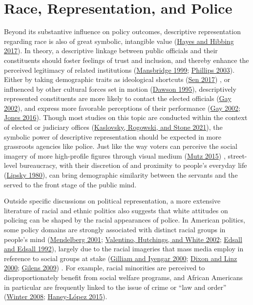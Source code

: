 \documentclass[
  12pt,
]{article}
\begin{document}
\hypertarget{race-representation-and-police}{%
\section{Race, Representation, and
Police}\label{race-representation-and-police}}

Beyond its substantive influence on policy outcomes, descriptive
representation regarding race is also of great symbolic, intangible
value (\protect\hyperlink{ref-hayes2017}{Hayes and Hibbing 2017}). In
theory, a descriptive linkage between public officials and their
constituents should foster feelings of trust and inclusion, and thereby
enhance the perceived legitimacy of related institutions
(\protect\hyperlink{ref-mansbridge1999}{Mansbridge 1999};
\protect\hyperlink{ref-phillips2003}{Phillips 2003}). Either by taking
demographic traits as ideological shortcuts
(\protect\hyperlink{ref-sen2017}{Sen 2017}) , or influenced by other
cultural forces set in motion (\protect\hyperlink{ref-dawson1995}{Dawson
1995}), descriptively represented constituents are more likely to
contact the elected officials (\protect\hyperlink{ref-gay2002}{Gay
2002}), and express more favorable perceptions of their performance
(\protect\hyperlink{ref-gay2002}{Gay 2002};
\protect\hyperlink{ref-jones2016}{Jones 2016}). Though most studies on
this topic are conducted within the context of elected or judiciary
offices (\protect\hyperlink{ref-kaslovsky2021}{Kaslovsky, Rogowski, and
Stone 2021}), the symbolic power of descriptive representation should be
expected in more grassroots agencies like police. Just like the way
voters can perceive the social imagery of more high-profile figures
through visual medium (\protect\hyperlink{ref-mutz2015}{Mutz 2015}) ,
street-level bureaucracy, with their discretion of and proximity to
people's everyday life (\protect\hyperlink{ref-lipsky1980}{Lipsky
1980}), can bring demographic similarity between the servants and the
served to the front stage of the public mind.

Outside specific discussions on political representation, a more
extensive literature of racial and ethnic politics also suggests that
white attitudes on policing can be shaped by the racial appearances of
police. In American politics, some policy domains are strongly
associated with distinct racial groups in people's mind
(\protect\hyperlink{ref-mendelberg2001}{Mendelberg 2001};
\protect\hyperlink{ref-valentino2002}{Valentino, Hutchings, and White
2002}; \protect\hyperlink{ref-edsall1992}{Edsall and Edsall 1992}),
largely due to the racial imageries that mass media employ in reference
to social groups at stake (\protect\hyperlink{ref-gilliam2000}{Gilliam
and Iyengar 2000}; \protect\hyperlink{ref-dixon2000}{Dixon and Linz
2000}; \protect\hyperlink{ref-gilens2009}{Gilens 2009}) . For example,
racial minorities are perceived to disproportionately benefit from
social welfare programs, and African Americans in particular are
frequently linked to the issue of crime or ``law and order''
(\protect\hyperlink{ref-winter2008}{Winter 2008};
\protect\hyperlink{ref-haney-luxf3pez2015}{Haney-López 2015}).
\end{document}

